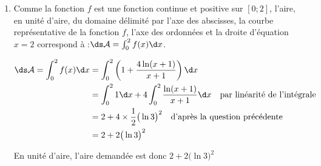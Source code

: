 \begin{enumerate}
\begin{enumerate}
			\item Comme la fonction $f$ est une fonction continue et positive sur $[0 ; 2]$, l'aire, en unité d'aire, du domaine délimité par l'axe des abscisses, la courbe représentative de la fonction $f$, l'axe des ordonnées et la droite d'équation \quad $x=2$ correspond à :\quad $\ds \mathcal{A} = \int_{0}^{2} f(x) \d x$.

			$\begin{aligned}
				\ds \mathcal{A} = \int_{0}^{2} f(x) \d x
					& = \int_{0}^{2} \left(1 + \dfrac{4\ln(x+1)}{x+1}\right) \d x\\
					& = \int_{0}^{2} 1\d x + 4 \int_{0}^{2} \dfrac{\ln(x+1)}{x+1} \d x \quad \text{par linéarité de l'intégrale}\\
					& = 2 + 4 \times \dfrac{1}{2}\big(\ln 3\big)^{2} \quad \text{d'après la question précédente}\\
					& = 2 + 2\big(\ln 3\big)^{2}
			\end{aligned}$

			En unité d'aire, l'aire demandée est donc $2 + 2\big(\ln 3\big)^{2}$
		\end{enumerate}
	\end{enumerate}
